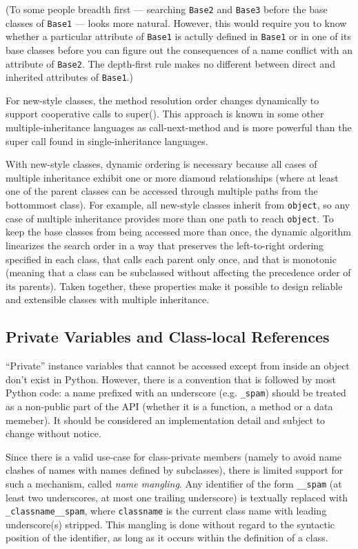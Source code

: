 \documentclass[UTF8]{article}
\begin{document}
(To some people breadth first --- searching \texttt{Base2} and \texttt{Base3} before the base
classes of \texttt{Base1} --- looks more natural. However, this would require you to know whether a
particular attribute of \texttt{Base1} is actully defined in \texttt{Base1} or in one of its base
classes before you can figure out the consequences of a name conflict with an attribute of
\texttt{Base2}. The depth-first rule makes no different between direct and inherited attributes of
\texttt{Base1}.)

For new-style classes, the method resolution order changes dynamically to support cooperative calls
to super(). This approach is known in some other multiple-inheritance languages as call-next-method
and is more powerful than the super call found in single-inheritance languages.

With new-style classes, dynamic ordering is necessary because all cases of multiple inheritance
exhibit one or more diamond relationships (where at least one of the parent classes can be accessed
through multiple paths from the bottommost class). For example, all new-style classes inherit from
\texttt{object}, so any case of multiple inheritance provides more than one path to reach
\texttt{object}. To keep the base classes from being accessed more than once, the dynamic algorithm
linearizes the search order in a way that preserves the left-to-right ordering specified in each
class, that calls each parent only once, and that is monotonic (meaning that a class can be
subclassed without affecting the precedence order of its parents). Taken together, these properties
make it possible to design reliable and extensible classes with multiple inheritance.

\subsection{Private Variables and Class-local References}
``Private'' instance variables that cannot be accessed except from inside an object don't exist in
Python. However, there is a convention that is followed by most Python code: a name prefixed with
an underscore (e.g. \texttt{\_spam}) should be treated as a non-public part of the API (whether it
is a function, a method or a data memeber). It should be considered an implementation detail and
subject to change without notice.

Since there is a valid use-case for class-private members (namely to avoid name clashes of names
with names defined by subclasses), there is limited support for such a mechanism, called \emph{name
mangling}. Any identifier of the form \texttt{\_\_spam} (at least two underscores, at most one
trailing underscore) is textually replaced with \texttt{\_classname\_\_spam}, where
\texttt{classname} is the current class name with leading underscore(s) stripped. This mangling is
done without regard to the syntactic position of the identifier, as long as it occurs within the
definition of a class.
\end{document}
